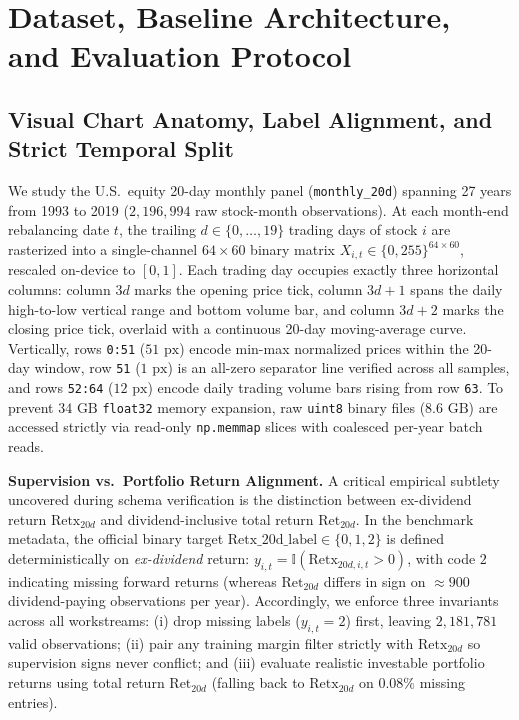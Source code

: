 \documentclass[10pt]{article}
\begin{document}
\section{Dataset, Baseline Architecture, and Evaluation Protocol}

\subsection{Visual Chart Anatomy, Label Alignment, and Strict Temporal Split}
We study the U.S.\ equity 20-day monthly panel (\texttt{monthly\_20d}) spanning 27 years from 1993 to 2019 ($2,196,994$ raw stock-month observations). At each month-end rebalancing date $t$, the trailing $d \in \{0, \dots, 19\}$ trading days of stock $i$ are rasterized into a single-channel $64 \times 60$ binary matrix $X_{i,t} \in \{0, 255\}^{64 \times 60}$, rescaled on-device to $[0, 1]$. Each trading day occupies exactly three horizontal columns: column $3d$ marks the opening price tick, column $3d+1$ spans the daily high-to-low vertical range and bottom volume bar, and column $3d+2$ marks the closing price tick, overlaid with a continuous 20-day moving-average curve. Vertically, rows \texttt{0:51} ($51\text{ px}$) encode min-max normalized prices within the 20-day window, row \texttt{51} ($1\text{ px}$) is an all-zero separator line verified across all samples, and rows \texttt{52:64} ($12\text{ px}$) encode daily trading volume bars rising from row \texttt{63}. To prevent $34\text{ GB}$ \texttt{float32} memory expansion, raw \texttt{uint8} binary files ($8.6\text{ GB}$) are accessed strictly via read-only \texttt{np.memmap} slices with coalesced per-year batch reads.

\textbf{Supervision vs.\ Portfolio Return Alignment.} A critical empirical subtlety uncovered during schema verification is the distinction between ex-dividend return $\text{Retx}_{20d}$ and dividend-inclusive total return $\text{Ret}_{20d}$. In the benchmark metadata, the official binary target $\text{Retx\_20d\_label} \in \{0, 1, 2\}$ is defined deterministically on \emph{ex-dividend} return: $y_{i,t} = \mathbb{I}(\text{Retx}_{20d,i,t} > 0)$, with code $2$ indicating missing forward returns (whereas $\text{Ret}_{20d}$ differs in sign on $\approx 900$ dividend-paying observations per year). Accordingly, we enforce three invariants across all workstreams: (i) drop missing labels ($y_{i,t} = 2$) first, leaving $2,181,781$ valid observations; (ii) pair any training margin filter strictly with $\text{Retx}_{20d}$ so supervision signs never conflict; and (iii) evaluate realistic investable portfolio returns using total return $\text{Ret}_{20d}$ (falling back to $\text{Retx}_{20d}$ on $0.08\%$ missing entries).
\end{document}
